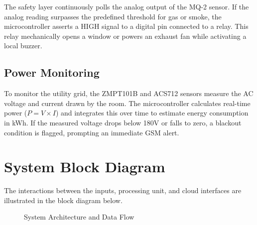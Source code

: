 \documentclass[12pt,a4paper]{article}
\begin{document}
The safety layer continuously polls the analog output of the MQ-2 sensor. If the analog reading surpasses the predefined threshold for gas or smoke, the microcontroller asserts a HIGH signal to a digital pin connected to a relay. This relay mechanically opens a window or powers an exhaust fan while activating a local buzzer.

\subsection{Power Monitoring}
To monitor the utility grid, the ZMPT101B and ACS712 sensors measure the AC voltage and current drawn by the room. The microcontroller calculates real-time power ($P = V \times I$) and integrates this over time to estimate energy consumption in kWh. If the measured voltage drops below 180V or falls to zero, a blackout condition is flagged, prompting an immediate GSM alert.

\section{System Block Diagram}
The interactions between the inputs, processing unit, and cloud interfaces are illustrated in the block diagram below.

\begin{figure}[H]
    \centering
    \caption{System Architecture and Data Flow}
    \label{fig:block_diagram}
\end{figure}
\end{document}
